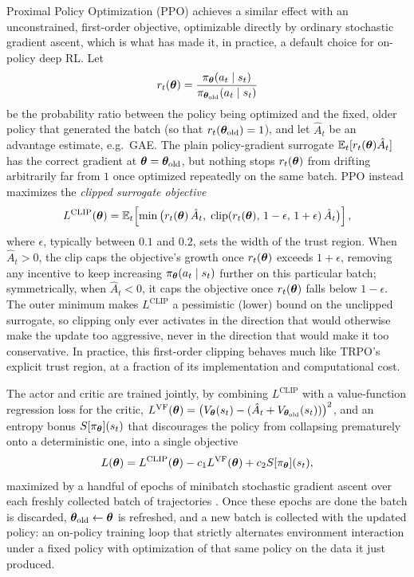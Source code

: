 Proximal Policy Optimization (PPO) \cite{schulman2017ppo} achieves a similar effect with an unconstrained, first-order objective, optimizable directly by ordinary stochastic gradient ascent, which is what has made it, in practice, a default choice for on-policy deep RL. Let
\begin{equation}
r_t(\bm{\theta}) = \frac{\pi_{\bm{\theta}}(a_t\mid s_t)}{\pi_{\bm{\theta}_{\mathrm{old}}}(a_t\mid s_t)}
\end{equation}
be the probability ratio between the policy being optimized and the fixed, older policy that generated the batch (so that $r_t(\bm{\theta}_{\mathrm{old}}) = 1$), and let $\hat A_t$ be an advantage estimate, e.g.\ GAE. The plain policy-gradient surrogate $\mathbb{E}_t[r_t(\bm{\theta})\hat A_t]$ has the correct gradient at $\bm{\theta} = \bm{\theta}_{\mathrm{old}}$, but nothing stops $r_t(\bm{\theta})$ from drifting arbitrarily far from $1$ once optimized repeatedly on the same batch. PPO instead maximizes the \emph{clipped surrogate objective}
\begin{equation}
L^{\mathrm{CLIP}}(\bm{\theta}) = \mathbb{E}_t\!\left[ \min\big( r_t(\bm{\theta})\,\hat A_t,\; \mathrm{clip}(r_t(\bm{\theta}),\, 1-\epsilon,\, 1+\epsilon)\,\hat A_t \big) \right],
\end{equation}
where $\epsilon$, typically between $0.1$ and $0.2$, sets the width of the trust region. When $\hat A_t > 0$, the clip caps the objective's growth once $r_t(\bm{\theta})$ exceeds $1+\epsilon$, removing any incentive to keep increasing $\pi_{\bm{\theta}}(a_t\mid s_t)$ further on this particular batch; symmetrically, when $\hat A_t < 0$, it caps the objective once $r_t(\bm{\theta})$ falls below $1-\epsilon$. The outer minimum makes $L^{\mathrm{CLIP}}$ a pessimistic (lower) bound on the unclipped surrogate, so clipping only ever activates in the direction that would otherwise make the update too aggressive, never in the direction that would make it too conservative. In practice, this first-order clipping behaves much like TRPO's explicit trust region, at a fraction of its implementation and computational cost.

The actor and critic are trained jointly, by combining $L^{\mathrm{CLIP}}$ with a value-function regression loss for the critic, $L^{\mathrm{VF}}(\bm{\theta}) = \big(V_{\bm{\theta}}(s_t) - (\hat A_t + V_{\bm{\theta}_{\mathrm{old}}}(s_t))\big)^2$, and an entropy bonus $S[\pi_{\bm{\theta}}](s_t)$ that discourages the policy from collapsing prematurely onto a deterministic one, into a single objective
\begin{equation}
L(\bm{\theta}) = L^{\mathrm{CLIP}}(\bm{\theta}) - c_1 L^{\mathrm{VF}}(\bm{\theta}) + c_2 S[\pi_{\bm{\theta}}](s_t),
\end{equation}
maximized by a handful of epochs of minibatch stochastic gradient ascent over each freshly collected batch of trajectories \cite{schulman2017ppo}. Once these epochs are done the batch is discarded, $\bm{\theta}_{\mathrm{old}} \leftarrow \bm{\theta}$ is refreshed, and a new batch is collected with the updated policy: an on-policy training loop that strictly alternates environment interaction under a fixed policy with optimization of that same policy on the data it just produced.

